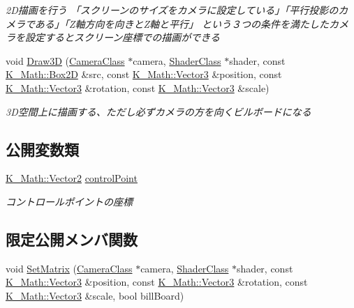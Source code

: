 \begin{DoxyCompactItemize}
\begin{DoxyCompactList}\small\item\em 2\+D描画を行う 「スクリーンのサイズをカメラに設定している」「平行投影のカメラである」「\+Z軸方向を向きと\+Z軸と平行」 という３つの条件を満たしたカメラを設定するとスクリーン座標での描画ができる \end{DoxyCompactList}\item 
void \mbox{\hyperlink{class_k___graphics_1_1_sprite_object_af288c290560faa26460fbff16a677439}{Draw3D}} (\mbox{\hyperlink{class_k___graphics_1_1_camera_class}{Camera\+Class}} $\ast$camera, \mbox{\hyperlink{class_k___graphics_1_1_shader_class}{Shader\+Class}} $\ast$shader, const \mbox{\hyperlink{struct_k___math_1_1_box2_d}{K\+\_\+\+Math\+::\+Box2D}} \&src, const \mbox{\hyperlink{namespace_k___math_a66884d78082c39ada4091c211f3570f8}{K\+\_\+\+Math\+::\+Vector3}} \&position, const \mbox{\hyperlink{namespace_k___math_a66884d78082c39ada4091c211f3570f8}{K\+\_\+\+Math\+::\+Vector3}} \&rotation, const \mbox{\hyperlink{namespace_k___math_a66884d78082c39ada4091c211f3570f8}{K\+\_\+\+Math\+::\+Vector3}} \&scale)
\begin{DoxyCompactList}\small\item\em 3\+D空間上に描画する、ただし必ずカメラの方を向くビルボードになる \end{DoxyCompactList}\end{DoxyCompactItemize}
\subsection*{公開変数類}
\begin{DoxyCompactItemize}
\item 
\mbox{\hyperlink{namespace_k___math_a41eb0c2c69c938cd59989eb3241cefb2}{K\+\_\+\+Math\+::\+Vector2}} \mbox{\hyperlink{class_k___graphics_1_1_sprite_object_ad5d76b9b0a30102d01abbb20bab285f8}{control\+Point}}
\begin{DoxyCompactList}\small\item\em コントロールポイントの座標 \end{DoxyCompactList}\end{DoxyCompactItemize}
\subsection*{限定公開メンバ関数}
\begin{DoxyCompactItemize}
\item 
void \mbox{\hyperlink{class_k___graphics_1_1_sprite_object_a4c731f8c8e7b35f4f2661a3d9d203f69}{Set\+Matrix}} (\mbox{\hyperlink{class_k___graphics_1_1_camera_class}{Camera\+Class}} $\ast$camera, \mbox{\hyperlink{class_k___graphics_1_1_shader_class}{Shader\+Class}} $\ast$shader, const \mbox{\hyperlink{namespace_k___math_a66884d78082c39ada4091c211f3570f8}{K\+\_\+\+Math\+::\+Vector3}} \&position, const \mbox{\hyperlink{namespace_k___math_a66884d78082c39ada4091c211f3570f8}{K\+\_\+\+Math\+::\+Vector3}} \&rotation, const \mbox{\hyperlink{namespace_k___math_a66884d78082c39ada4091c211f3570f8}{K\+\_\+\+Math\+::\+Vector3}} \&scale, bool bill\+Board)
\end{DoxyCompactItemize}
